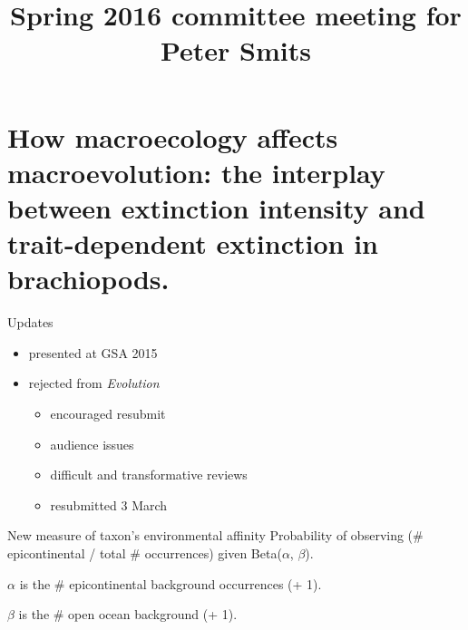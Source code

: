 \documentclass{beamer}
\title{Spring 2016 committee meeting for Peter Smits}
\author{}
\institute{}
\date{}
\begin{document}
\begin{frame}
  \maketitle
\end{frame}

\begin{frame}
  \tableofcontents
\end{frame}


\section{How macroecology affects macroevolution: the interplay between extinction intensity and trait-dependent extinction in brachiopods.}

\begin{frame}
  \begin{block}{Updates}
    \begin{itemize}
      \item presented at GSA 2015
      \item rejected from \textit{Evolution}
        \begin{itemize}
          \item encouraged resubmit
          \item audience issues
          \item difficult and transformative reviews
          \item resubmitted 3 March
        \end{itemize}
    \end{itemize}
  \end{block}
\end{frame}

\begin{frame}
  \begin{block}{New measure of taxon's environmental affinity}
    Probability of observing (\# epicontinental / total \# occurrences) given Beta(\(\alpha\), \(\beta\)).

    \(\alpha\) is the \# epicontinental background occurrences (+ 1).

    \(\beta\) is the \# open ocean background (+ 1).
  \end{block}
\end{frame}
\end{document}
